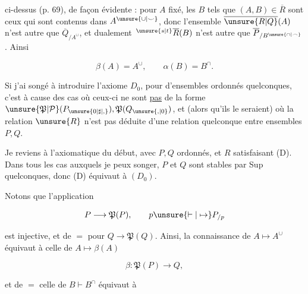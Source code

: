 
ci-dessus (p. 69), de façon évidente : pour $A$ fixé, les $B$ tels que $(A,B)\in\overline R$ sont ceux qui sont contenus dans $A^{\unsure{\cup|\smile}}$, donc l'ensemble $\overline{\unsure{R|Q}}(A)$ n'est autre que $\overline Q_{/A^\cup}$, et dualement $\,{}^{\unsure{s|t}}\overline R(B)$ n'est autre que $\overline P_{/B^{\unsure{\cap|\frown}}}$. Ainsi

\[
 \beta(A)=A^\cup,\qquad\alpha(B)=B^\cap.
 \tag*{(5.14)}
\]

Si j'ai songé à introduire  l'axiome $D_0$, pour   d'ensembles ordonnés quelconques, c'est à cause des cas où ceux-ci ne sont \uline{pas} de la forme $\unsure{\mathfrak P|\mathcal P}(P_{\unsure{0|\sharp|,}}),\mathfrak P(Q_{\unsure{,|0}})$, et (alors  qu'ils le seraient) où la relation $\unsure{R}$  n'est pas déduite  d'une relation quelconque entre ensembles $P,Q$.

Je reviens  à l'axiomatique du début, avec $P,Q$ ordonnés, et $R$ satisfaisant (D). Dans tous les cas auxquels je peux songer, $P$ et $Q$ sont stables par Sup quelconques, donc (D) équivaut à $(D_0)$.

Notons que l'application

\[
 P\longrightarrow\mathfrak P(P),\qquad p\unsure{\vdash|\mapsto} P_{/p}
\]

est injective, et de $=$ pour $Q\to\mathfrak P(Q)$. Ainsi, la connaissance de $A\mapsto A^\cup$ équivaut à celle de $A\longmapsto\beta(A)$

\[
 \beta:\mathfrak P(P)\longrightarrow Q,
\]

et de $=$ celle de $B\vdash B^\cap$ équivaut à
